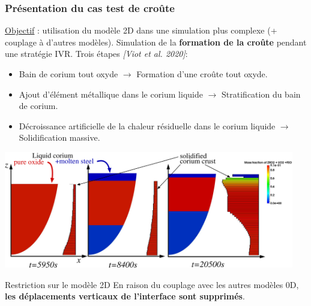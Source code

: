 \documentclass{beamer}
\newcommand{\bib}[1]{{\color{cea_texte!80}\tiny\textit{[#1]}}}
\begin{document}
\begin{frame}
    \frametitle{Présentation du cas test de croûte}
 \scriptsize
    \underline{Objectif} : utilisation du modèle 2D dans une simulation plus complexe (+ couplage à d'autres modèles). Simulation de la \textbf{formation de la croûte} pendant une stratégie IVR. Trois étapes \bib{Viot et al. 2020}:
    
    \begin{itemize}
        \item \color{cea_texte!70}Bain de corium tout oxyde $\rightarrow$ Formation d'une croûte tout oxyde.
        \item Ajout d'élément métallique dans le corium liquide $\rightarrow$ Stratification du bain de corium.
        \item Décroissance artificielle de la chaleur résiduelle dans le corium liquide  $\rightarrow$ Solidification massive.\color{cea_texte}
    \end{itemize}
    \begin{center}
    \includegraphics[width=0.95\textwidth]{Figures/industrial_test_sketch.pdf}
    \end{center}
    
        	\begin{ceaalertblock}{Restriction sur le modèle 2D}
        	\tiny
        	En raison du couplage avec les autres modèles 0D, \textbf{les déplacements verticaux de l'interface sont supprimés}.
    	\end{ceaalertblock}
    
\end{frame}
\end{document}
